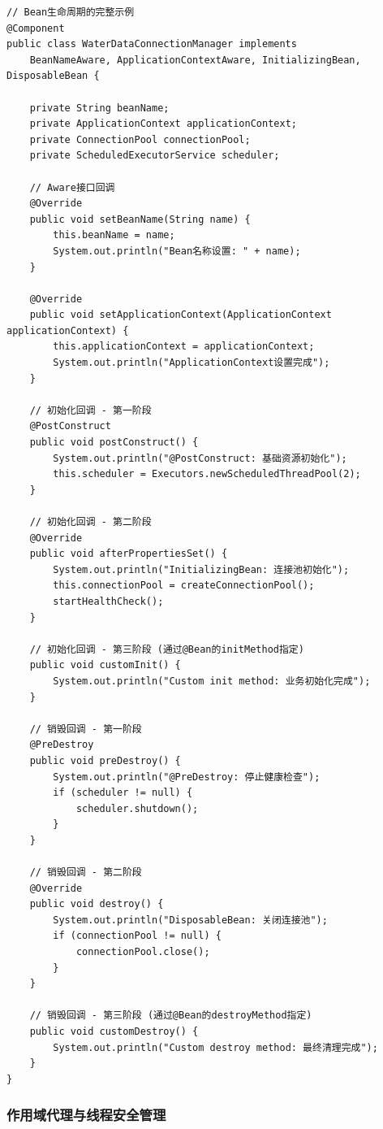 \begin{lstlisting}[style=java]
// Bean生命周期的完整示例
@Component
public class WaterDataConnectionManager implements 
    BeanNameAware, ApplicationContextAware, InitializingBean, DisposableBean {
    
    private String beanName;
    private ApplicationContext applicationContext;
    private ConnectionPool connectionPool;
    private ScheduledExecutorService scheduler;
    
    // Aware接口回调
    @Override
    public void setBeanName(String name) {
        this.beanName = name;
        System.out.println("Bean名称设置: " + name);
    }
    
    @Override
    public void setApplicationContext(ApplicationContext applicationContext) {
        this.applicationContext = applicationContext;
        System.out.println("ApplicationContext设置完成");
    }
    
    // 初始化回调 - 第一阶段
    @PostConstruct
    public void postConstruct() {
        System.out.println("@PostConstruct: 基础资源初始化");
        this.scheduler = Executors.newScheduledThreadPool(2);
    }
    
    // 初始化回调 - 第二阶段
    @Override
    public void afterPropertiesSet() {
        System.out.println("InitializingBean: 连接池初始化");
        this.connectionPool = createConnectionPool();
        startHealthCheck();
    }
    
    // 初始化回调 - 第三阶段 (通过@Bean的initMethod指定)
    public void customInit() {
        System.out.println("Custom init method: 业务初始化完成");
    }
    
    // 销毁回调 - 第一阶段
    @PreDestroy
    public void preDestroy() {
        System.out.println("@PreDestroy: 停止健康检查");
        if (scheduler != null) {
            scheduler.shutdown();
        }
    }
    
    // 销毁回调 - 第二阶段
    @Override
    public void destroy() {
        System.out.println("DisposableBean: 关闭连接池");
        if (connectionPool != null) {
            connectionPool.close();
        }
    }
    
    // 销毁回调 - 第三阶段 (通过@Bean的destroyMethod指定)
    public void customDestroy() {
        System.out.println("Custom destroy method: 最终清理完成");
    }
}
\end{lstlisting}

\hypertarget{ux4f5cux7528ux57dfux4ee3ux7406ux4e0eux7ebfux7a0bux5b89ux5168ux7ba1ux7406}{%
\subsubsection{作用域代理与线程安全管理}\label{ux4f5cux7528ux57dfux4ee3ux7406ux4e0eux7ebfux7a0bux5b89ux5168ux7ba1ux7406}}


